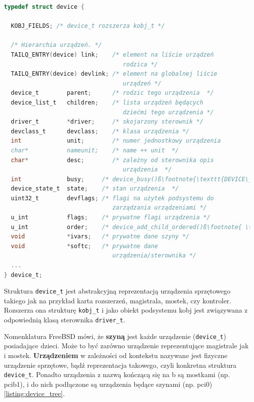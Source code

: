 \documentclass[shortabstract,inz]{iithesis}
\begin{document}
\begin{lstlisting}[language=C, caption=Reprezentacja urządzenia,escapechar=ß,label={listing:device}] 
typedef struct device {

  KOBJ_FIELDS; /* device_t rozszerza kobj_t */

  /* Hierarchia urządzeń. */
  TAILQ_ENTRY(device) link;    /* element na liście urządzeń
                                  rodzica */
  TAILQ_ENTRY(device) devlink; /* element na globalnej liście 
                                  urządzeń */
  device_t        parent;      /* rodzic tego urządzenia  */
  device_list_t   children;    /* lista urządzeń będących 
                                  dziećmi tego urządzenia */
  driver_t        *driver;     /* skojarzony sterownik */
  devclass_t      devclass;    /* klasa urządzenia */
  int             unit;        /* numer jednostkowy urządzenia
  char*           nameunit;    /* name ++ unit  */
  char*           desc;        /* zależny od sterownika opis 
                                  urządzenia  */
  int             busy;     /* device_busy()ß\footnote{\texttt{DEVICE\_GET\_STATE(9)} - \url{https://www.freebsd.org/cgi/man.cgi?query=device_busy&sektion=9&manpath=FreeBSD+11.2-RELEASE+and+Ports}}ß */
  device_state_t  state;    /* stan urządzenia  */
  uint32_t        devflags; /* flagi na użytek podsystemu do 
                               zarządzania urządzeniami */
  u_int           flags;    /* prywatne flagi urządzenia */
  u_int           order;    /* device_add_child_ordered()ß\footnote{ \texttt{DEVICE\_ADD\_CHILD(9)} - \url{https://www.freebsd.org/cgi/man.cgi?query=device_add_child_ordered&manpath=FreeBSD+11.2-RELEASE+and+Ports}}ß */
  void            *ivars;   /* prywatne dane szyny */
  void            *softc;   /* prywatne dane 
                               urządzenia/sterownika */
  ...
} device_t;
\end{lstlisting}

Struktura \texttt{device\_t} jest abstrakcyjną reprezentacją urządzenia sprzętowego
takiego jak na przykład karta rozszerzeń, magistrala, mostek, czy kontroler.
Rozszerza ona strukturę \texttt{kobj\_t} i jako obiekt podsystemu kobj jest
związywana z odpowiednią klasą sterownika  \texttt{driver\_t}.

Nomenklatura FreeBSD mówi, że \textbf{szyną} jest każde urządzenie (\texttt{device\_t})
posiadające dzieci. Może to być zarówno urządzenie reprezentujące magistrale jak i mostek.
\textbf{Urządzeniem} w zależności od kontekstu nazywane jest fizyczne urządzenie sprzętowe,
bądź reprezentacja takowego, czyli konkretna struktura \texttt{device\_t}.
Ponadto urządzenia z nazwą kończącą się na b są mostkami (np. pcib1), i do nich
podłączone są urządzenia będące szynami (np. pci0) \ref{listing:device_tree}.
\end{document}
